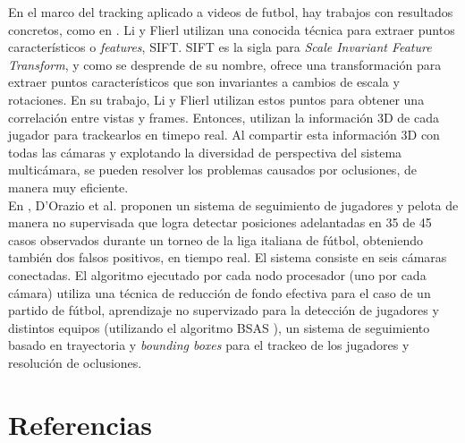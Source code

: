 \documentclass[a4paper,10pt]{article}
\begin{document}
En el marco del tracking aplicado a videos de futbol, hay trabajos
con resultados concretos, como en \cite{paper-suecia-soccer} \cite{papers-tanos}.
Li y Flierl \cite{paper-suecia-soccer} utilizan una conocida técnica para extraer
puntos característicos o \textit{features}, SIFT. SIFT es la sigla para \textit{Scale Invariant Feature Transform}, y como se 
desprende de su nombre, ofrece una transformación para extraer puntos característicos
que son invariantes a cambios de escala y rotaciones. En su trabajo, Li y Flierl utilizan estos 
puntos para obtener una correlación entre vistas y frames. Entonces, utilizan la
información 3D de cada jugador para trackearlos en timepo real. Al compartir esta información 3D con
todas las cámaras y explotando la diversidad de perspectiva del sistema multicámara,
se pueden resolver los problemas causados por oclusiones, de manera muy eficiente.\\

En \cite{papers-tanos}, D'Orazio et al. proponen un sistema de seguimiento de
jugadores y pelota de manera no supervisada que logra detectar posiciones
adelantadas en 35 de 45 casos observados durante un torneo de la liga italiana
de fútbol, obteniendo también dos falsos positivos, en tiempo real. El sistema consiste en seis
cámaras conectadas. El algoritmo ejecutado por cada nodo procesador (uno por
cada cámara) utiliza una técnica de reducción de fondo efectiva para el caso de
un partido de fútbol, aprendizaje no supervizado para la detección de jugadores
y distintos equipos (utilizando el algoritmo BSAS \cite{paper-bsas}), un
sistema de seguimiento basado en trayectoria y \textit{bounding boxes} para el
trackeo de los jugadores y resolución de oclusiones.

\section*{Referencias}
\printbibliography
\end{document}
